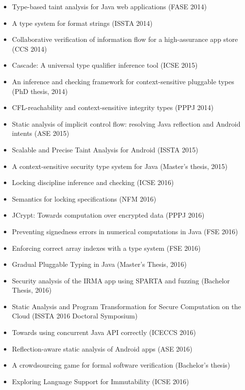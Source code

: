 \begin{itemize}
\item
  Type-based taint analysis for Java web applications (FASE 2014)~\cite{HuangDM2014}
\item
  A type system for format strings (ISSTA 2014)~\cite{WeitzKSE2014}
\item
  Collaborative verification of information flow for a high-assurance app
  store (CCS 2014)~\cite{ErnstJMDPRKBBHVW2014}
\item
  Cascade: A universal type qualifier inference tool (ICSE 2015)~\cite{VakilianPEJ2015}
\item
  An inference and checking framework for context-sensitive pluggable types
  (PhD thesis, 2014)~\cite{Huang2014}
\item
  CFL-reachability and context-sensitive integrity types (PPPJ 2014)~\cite{MilanovaHD2014}


\item
  Static analysis of implicit control flow: resolving Java reflection and
  Android intents (ASE 2015)~\cite{BarrosJMVDdAE2015}
\item
  Scalable and Precise Taint Analysis for Android (ISSTA 2015)~\cite{HuangDMD2015}
\item
  A context-sensitive security type system for Java (Master's thesis, 2015)~\cite{Kaiser2015}


\item
  Locking discipline inference and checking (ICSE 2016)~\cite{ErnstLMST2016}
\item
  Semantics for locking specifications (NFM 2016)~\cite{ErnstMMS2016}
\item
  JCrypt: Towards computation over encrypted data (PPPJ 2016)~\cite{DongMD2016:JCrypt}
\item
  Preventing signedness errors in numerical computations in Java (FSE
  2016)~\cite{Mackie2016}
\item
  Enforcing correct array indexes with a type system (FSE 2016)~\cite{Santino2016}
\item
  Gradual Pluggable Typing in Java (Master's Thesis, 2016)~\cite{Brotherston2016}
\item
  Security analysis of the IRMA app using SPARTA and fuzzing (Bachelor
  Thesis, 2016)~\cite{Brinker2016}
\item
  Static Analysis and Program Transformation for Secure Computation on the
  Cloud (ISSTA 2016 Doctoral Symposium)~\cite{DongMD2016:secure-cloud}
\item
  Towards using concurrent Java API correctly (ICECCS 2016)~\cite{LiuBSD2016}
\item
  Reflection-aware static analysis of Android apps (ASE 2016)~\cite{LiBOK2016}
\item
  A crowdsourcing game for formal software verification (Bachelor's thesis)~\cite{Irini2016}
\item
  Exploring Language Support for Immutability (ICSE 2016)~\cite{CoblenzSAMWS2016}



\end{itemize}
